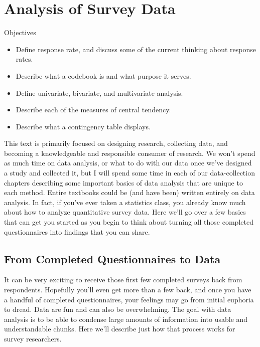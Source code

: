 \section{Analysis of Survey Data}

\begin{center}
	\begin{objbox}{Objectives}
		\begin{itemize}
			\setlength{\itemsep}{0pt}
			\setlength{\parskip}{0pt}
			\setlength{\parsep}{0pt}
			
			\item Define response rate, and discuss some of the current thinking about response rates.
			\item Describe what a codebook is and what purpose it serves.
			\item Define univariate, bivariate, and multivariate analysis.
			\item Describe each of the measures of central tendency.
			\item Describe what a contingency table displays.
			
		\end{itemize}
	\end{objbox}
\end{center}

This text is primarily focused on designing research, collecting data, and becoming a knowledgeable and responsible consumer of research. We won’t spend as much time on data analysis, or what to do with our data once we’ve designed a study and collected it, but I will spend some time in each of our data-collection chapters describing some important basics of data analysis that are unique to each method. Entire textbooks could be (and have been) written entirely on data analysis. In fact, if you’ve ever taken a statistics class, you already know much about how to analyze quantitative survey data. Here we’ll go over a few basics that can get you started as you begin to think about turning all those completed questionnaires into findings that you can share.

\subsection{From Completed Questionnaires to Data}

It can be very exciting to receive those first few completed surveys back from respondents. Hopefully you’ll even get more than a few back, and once you have a handful of completed questionnaires, your feelings may go from initial euphoria to dread. Data are fun and can also be overwhelming. The goal with data analysis is to be able to condense large amounts of information into usable and understandable chunks. Here we’ll describe just how that process works for survey researchers.

